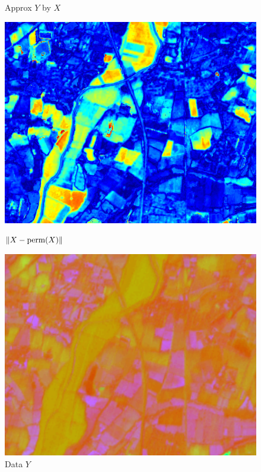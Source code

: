 \documentclass{beamer}
\begin{document}
\begin{frame}
\begin{figure}[ht]
\begin{minipage}[b]{0.28\linewidth}
      \caption{Approx $Y$ by $X$}
    \end{minipage}
    \hfill
    \begin{minipage}[b]{0.28\linewidth}
      \centering
      \includegraphics[width=\textwidth]{./Images/ChangeDetect/Flood/ChangesXtoY.png}
      \caption{$\left\lVert X - \text{perm}(X)\right\rVert$}
    \end{minipage}
    \begin{minipage}[b]{0.28\linewidth}
      \centering
      \includegraphics[width=\textwidth]{./Images/ChangeDetect/Flood/pictureY.png}
      \caption{Data $Y$}
    \end{minipage}

\end{figure}
\end{frame}
\end{document}

